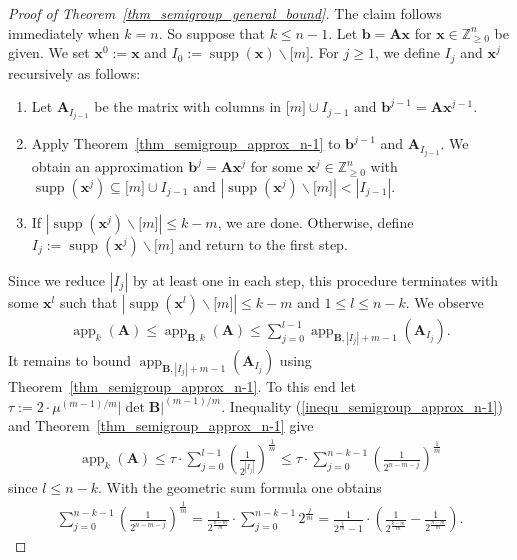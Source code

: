 \documentclass[pdflatex]{sn-jnl}
\DeclareMathOperator{\app}{app}
\DeclareMathOperator{\supp}{supp}
\newcommand{\Z}{\mathbb{Z}}
\newcommand{\bA}{\bm{A}}
\newcommand{\bx}{\bm{x}}
\newcommand{\bb}{\bm{b}}
\newcommand{\bB}{\bm{B}}
\theoremstyle{thmstyleone}%
\theoremstyle{thmstyletwo}%
\theoremstyle{thmstylethree}%
\begin{document}
	\begin{proof}[Proof of Theorem~\ref{thm_semigroup_general_bound}]
		The claim follows immediately when $k = n$. So suppose that $k\leq n - 1$. Let ${\bb} = \bA {\bx}$ for ${\bx}\in\Z^n_{\geq 0}$ be given. We set $\bx^0 := \bx$ and $I_{0} := \supp(\bx)\backslash \lbrack m\rbrack$.
		For $j \geq 1$, we define $I_j$ and $\bx^j$ recursively as follows:
		\begin{enumerate}
			\item Let $\bA_{I_{j-1}} $ be the matrix with  columns  in $\lbrack m\rbrack\cup I_{j-1}$ and  $\bb^{j-1} = \bA {\bx}^{j-1}$.
			\item Apply Theorem~\ref{thm_semigroup_approx_n-1} to $\bb^{j-1}$ and $\bA_{I_{j-1}}$. We obtain an approximation $ {\bb}^j = \bA\bx^j$ for some $\bx^j\in\Z^{n}_{\geq 0}$ with $\supp(\bx^j)\subseteq \lbrack m\rbrack \cup I_{j-1}$ and $\left|\supp(\bx^j)\backslash\lbrack m\rbrack\right| < |I_{j-1}|$. 
			\item If $\left|\supp(\bx^j)\backslash\lbrack m\rbrack\right| \leq k - m$, we are done. 
			Otherwise, define $I_j := \supp(\bx^j)\backslash\lbrack m\rbrack$ and return to the first step.
		\end{enumerate}
		Since we reduce $|I_j|$ by at least one in each step, this procedure terminates with some $\bx^l$ such that $\left|\supp(\bx^l)\backslash\lbrack m\rbrack\right|\leq k - m$ and $1\leq l\leq n-k$. We observe
		\begin{align}
			\label{inequ_semigroup_approx_n-1}
			\app_k(\bA)\leq\app_{\bB,k}(\bA)\leq \sum_{j = 0}^{l-1} \app_{\bB,\left|I_j\right| + m - 1}(\bA_{I_j}).
		\end{align}
		It remains to bound $\app_{\bB,\left|I_j\right| + m - 1}(\bA_{I_j})$ using Theorem~\ref{thm_semigroup_approx_n-1}. To this end let 
		$\tau := 2\cdot \mu^{(m-1)/m}\left|\det\bB\right|^{(m-1)/m}.$
		Inequality (\ref{inequ_semigroup_approx_n-1}) and Theorem~\ref{thm_semigroup_approx_n-1} give 
		\begin{align*}
			\app_{k}(\bA)\leq \tau\cdot\sum_{j = 0}^{l-1}\left(\frac{1}{2^{\left| I_j\right|}}\right)^\frac{1}{m}\leq \tau\cdot\sum_{j = 0}^{n - k - 1}\left(\frac{1}{2^{n - m - j}}\right)^\frac{1}{m}
		\end{align*}
		since $l\leq n - k$.  With the geometric sum formula one obtains
		\begin{align*}
			\sum_{j = 0}^{n - k - 1}\left(\frac{1}{2^{n - m - j}}\right)^\frac{1}{m} = \frac{1}{2^{\frac{n - m}{m}}}\cdot\sum_{j = 0}^{n- k - 1} 2^{\frac{j}{m}} = \frac{1}{2^{\frac{1}{m}} - 1}\cdot \left(\frac{1}{2^{\frac{k-m}{m}}} - \frac{1}{2^{\frac{n-m}{m}}}\right). 
		\end{align*}
	\end{proof}
	
\end{document}
